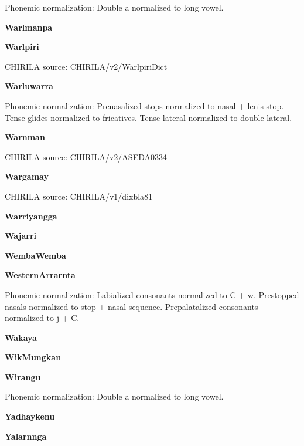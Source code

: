 Phonemic normalization: Double a normalized to long vowel.

\textbf{Warlmanpa}


\textbf{Warlpiri}

CHIRILA source: CHIRILA/v2/WarlpiriDict


\textbf{Warluwarra}


Phonemic normalization: Prenasalized stops normalized to nasal + lenis
stop. Tense glides normalized to fricatives. Tense lateral normalized to
double lateral.

\textbf{Warnman}

CHIRILA source: CHIRILA/v2/ASEDA0334


\textbf{Wargamay}

CHIRILA source: CHIRILA/v1/dixbla81


\textbf{Warriyangga}


\textbf{Wajarri}


\textbf{WembaWemba}


\textbf{WesternArrarnta}


Phonemic normalization: Labialized consonants normalized to C + w.
Prestopped nasals normalized to stop + nasal sequence. Prepalatalized
consonants normalized to j + C.

\textbf{Wakaya}


\textbf{WikMungkan}


\textbf{Wirangu}


Phonemic normalization: Double a normalized to long vowel.

\textbf{Yadhaykenu}


\textbf{Yalarnnga}


